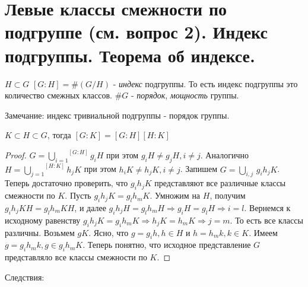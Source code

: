 \section{Левые классы смежности по подгруппе (см. вопрос 2). Индекс подгруппы. Теорема об индексе.}

\begin{defn}
  $ H \subset G $ \newline
  $ [G:H] = \#(G/H) $ - \emph{индекс} подгруппы. То есть индекс подгруппы это количество смежных классов. \newline
  $ \#G $ - \emph{порядок}, \emph{мощность} группы. 
\end{defn}

Замечание: индекс тривиальной подгруппы - порядок группы.

\begin{thm}
  $ K \subset H \subset G $, \newline тогда $ [G:K] = [G:H][H:K] $
\end{thm}
\begin{proof}
  $ G = \overset{[G:H]}{\underset{i=1}{\bigcup}} g_{i}H $ при этом $ g_{i}H \ne g_{j}H, i \ne j $. 
  Аналогично $ H = \overset{[H:K]}{\underset{j=1}\bigcup} h_{j}K $ при этом $ h_{i}K \ne h_{j}K, i \ne j $. 
  Запишем $ G = \underset{i, j}\bigcup \, g_{i}h_{j}K $. \newline
  Теперь достаточно проверить, что $ g_{i}h_{j}K $ представляют все различные классы смежности по $ K $.
  Пусть $ g_{i}h_{j}K = g_{l}h_{m}K $. Умножим на $ H $, получим $ g_{i}h_{j}KH = g_{l}h_{m}KH $, и далее
  $ g_{i}h_{j}H = g_{l}h_{m}H \Rightarrow  g_{i}H = g_{l}H \Rightarrow i = l $. Вернемся к исходному равенству
  $ g_{i}h_{j}K = g_{i}h_{m}K \Rightarrow h_{j}K = h_{m}K \Rightarrow j = m $. То есть все классы различны. \newline
  Возьмем $ gK $. Ясно, что $ g = g_{i}h, h \in H $ и $ h = h_{m}k, k \in K $. Имеем 
  $ g = g_{i}h_{m}k, g \in g_{i}h_{m}K $. Теперь понятно, что исходное представление $ G $ представляло все классы
  смежности по $ K $.
\end{proof}

Следствия:

